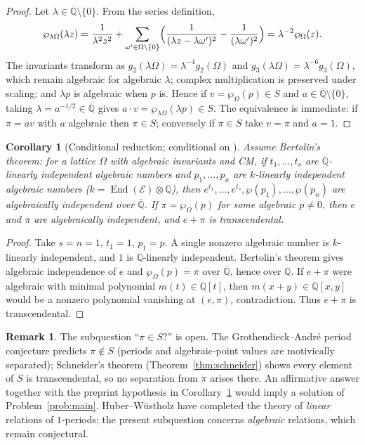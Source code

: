 \documentclass[11pt]{amsart}
\newtheorem{corollary}[theorem]{Corollary}
\theoremstyle{definition}
\newtheorem{remark}[theorem]{Remark}
\theoremstyle{remark}
\numberwithin{equation}{section}
\newcommand{\Q}{\mathbb{Q}}
\newcommand{\Qbar}{\overline{\mathbb{Q}}}
\newcommand{\ee}{e}
\begin{document}
\begin{proof}
Let $\lambda\in\Qbar\setminus\{0\}$. From the series definition,
\[
\wp_{\lambda\Omega}(\lambda z)=\frac1{\lambda^2z^2}+\sum_{\omega'\in\Omega\setminus\{0\}}\Bigl(\frac1{(\lambda z-\lambda\omega')^2}-\frac1{(\lambda\omega')^2}\Bigr)=\lambda^{-2}\wp_\Omega(z).
\]
The invariants transform as $g_2(\lambda\Omega)=\lambda^{-4}g_2(\Omega)$ and $g_3(\lambda\Omega)=\lambda^{-6}g_3(\Omega)$, which remain algebraic for algebraic $\lambda$; complex multiplication is preserved under scaling; and $\lambda p$ is algebraic when $p$ is. Hence if $v=\wp_\Omega(p)\in S$ and $a\in\Qbar\setminus\{0\}$, taking $\lambda=a^{-1/2}\in\Qbar$ gives $a\cdot v=\wp_{\lambda\Omega}(\lambda p)\in S$. The equivalence is immediate: if $\pi=a v$ with $a$ algebraic then $\pi\in S$; conversely if $\pi\in S$ take $v=\pi$ and $a=1$.
\end{proof}

\begin{corollary}[Conditional reduction; conditional on {\cite{Bertolin2026}}]\label{cor:bertolin}
Assume Bertolin's theorem: for a lattice $\Omega$ with algebraic invariants and CM, if $t_1,\dots,t_s$ are $\Q$-linearly independent algebraic numbers and $p_1,\dots,p_n$ are $k$-linearly independent algebraic numbers ($k=\operatorname{End}(\mathcal E)\otimes\Q$), then $\ee^{t_1},\dots,\ee^{t_s},\wp(p_1),\dots,\wp(p_n)$ are algebraically independent over $\Qbar$. If $\pi=\wp_\Omega(p)$ for some algebraic $p\ne0$, then $\ee$ and $\pi$ are algebraically independent, and $e+\pi$ is transcendental.
\end{corollary}

\begin{proof}
Take $s=n=1$, $t_1=1$, $p_1=p$. A single nonzero algebraic number is $k$-linearly independent, and $1$ is $\Q$-linearly independent. Bertolin's theorem gives algebraic independence of $\ee$ and $\wp_\Omega(p)=\pi$ over $\Qbar$, hence over $\Q$. If $e+\pi$ were algebraic with minimal polynomial $m(t)\in\Q[t]$, then $m(x+y)\in\Q[x,y]$ would be a nonzero polynomial vanishing at $(e,\pi)$, contradiction. Thus $e+\pi$ is transcendental.
\end{proof}

\begin{remark}
The subquestion ``$\pi\in S$?'' is open. The Grothendieck--André period conjecture predicts $\pi\notin S$ (periods and algebraic-point values are motivically separated); Schneider's theorem (Theorem~\ref{thm:schneider}) shows every element of $S$ is transcendental, so no separation from $\pi$ arises there. An affirmative answer together with the preprint hypothesis in Corollary~\ref{cor:bertolin} would imply a solution of Problem~\ref{prob:main}. Huber--W\"ustholz \cite{HuberWustholz2022} have completed the theory of \emph{linear} relations of $1$-periods; the present subquestion concerns \emph{algebraic} relations, which remain conjectural.
\end{remark}
\end{document}
